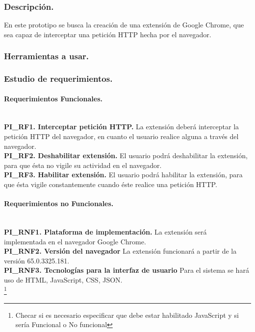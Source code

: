 \documentclass[12pt, a4paper, titlepage]{article}
\begin{document}
			\subsubsection{Descripción.}
				En este prototipo se busca la creación de una extensión de Google Chrome, que sea capaz de interceptar una petición HTTP hecha por el navegador.
			\subsubsection{Herramientas a usar.}
				
			
\subsubsection{Estudio de requerimientos.}
				
				\paragraph{Requerimientos Funcionales.\\ \\}
				
				{\setlength{\parindent}{12pt}
				\textbf{PI\_RF1. Interceptar petición HTTP.} La extensión deberá interceptar la petición HTTP del navegador, en cuanto el usuario realice alguna a través del navegador.\\

				\textbf{PI\_RF2. Deshabilitar extensión.} El usuario podrá deshabilitar la extensión, para que ésta no vigile su actividad en el navegador.\\
				
				\textbf{PI\_RF3. Habilitar extensión.} El usuario podrá habilitar la extensión, para que ésta vigile constantemente cuando éste realice una petición HTTP.
				}
				
				\paragraph{Requerimientos no Funcionales.\\ \\}
				{\setlength{\parindent}{12pt}
				
				\textbf{PI\_RNF1. Plataforma de implementación.} La extensión será implementada en el navegador Google Chrome.\\
				
				\textbf{PI\_RNF2. Versión del navegador} La extensión funcionará a partir de la versión 65.0.3325.181.\\
				
				\textbf{PI\_RNF3. Tecnologías para la interfaz de usuario} Para el sistema se hará uso de HTML, JavaScript, CSS, JSON.\\
				\footnote{Checar si es necesario especificar que debe estar habilitado JavaScript y si sería Funcional o No funcional}
				
				}\newpage
			
\end{document}
